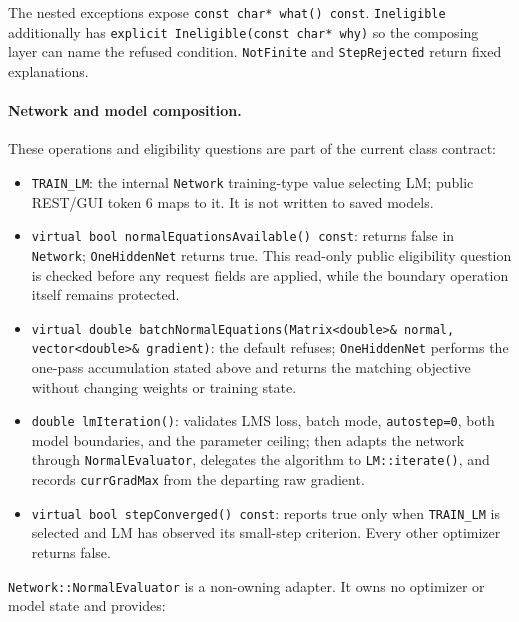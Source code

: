 The nested exceptions expose \texttt{const char* what() const}.
\texttt{Ineligible} additionally has
\texttt{explicit Ineligible(const char* why)} so the composing layer can name
the refused condition. \texttt{NotFinite} and \texttt{StepRejected} return
fixed explanations.

\paragraph{Network and model composition.} These operations and eligibility
questions are part of the current class contract:

\begin{itemize}
\item \texttt{TRAIN\_LM}: the internal \texttt{Network} training-type value
      selecting LM; public REST/GUI token 6 maps to it. It is not written to
      saved models.
\item \texttt{virtual bool normalEquationsAvailable() const}: returns false in
      \texttt{Network}; \texttt{OneHiddenNet} returns true. This read-only
      public eligibility question is checked before any request fields are
      applied, while the boundary operation itself remains protected.
\item \texttt{virtual double batchNormalEquations(Matrix<double>\& normal,
      vector<double>\& gradient)}: the default refuses;
      \texttt{OneHiddenNet} performs the one-pass accumulation stated above and
      returns the matching objective without changing weights or training state.
\item \texttt{double lmIteration()}: validates LMS loss, batch mode,
      \texttt{autostep=0}, both model boundaries, and the parameter ceiling;
      then adapts the network through \texttt{NormalEvaluator}, delegates the
      algorithm to \texttt{LM::iterate()}, and records \texttt{currGradMax} from
      the departing raw gradient.
\item \texttt{virtual bool stepConverged() const}: reports true only when
      \texttt{TRAIN\_LM} is selected and LM has observed its small-step
      criterion. Every other optimizer returns false.
\end{itemize}

\texttt{Network::NormalEvaluator} is a non-owning adapter. It owns no optimizer
or model state and provides:

